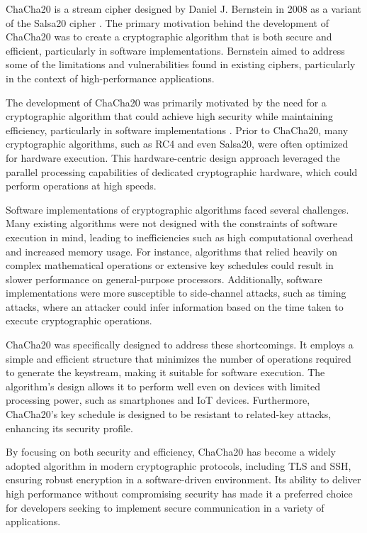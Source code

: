 \documentclass[a4paper,12pt]{report}
\begin{document}
ChaCha20 is a stream cipher designed by Daniel J. Bernstein in 2008 as a variant of the Salsa20 cipher \cite{bernstein2008chacha}.
The primary motivation behind the development of ChaCha20 was to create a cryptographic algorithm that is both secure and efficient, particularly in software implementations.
Bernstein aimed to address some of the limitations and vulnerabilities found in existing ciphers, particularly in the context of high-performance applications.

The development of ChaCha20 was primarily motivated by the need for a cryptographic algorithm that could achieve high security while maintaining efficiency, particularly in software implementations \cite{wikipedia_chacha20_poly1305}.
Prior to ChaCha20, many cryptographic algorithms, such as RC4 and even Salsa20, were often optimized for hardware execution.
This hardware-centric design approach leveraged the parallel processing capabilities of dedicated cryptographic hardware, which could perform operations at high speeds.

Software implementations of cryptographic algorithms faced several challenges.
Many existing algorithms were not designed with the constraints of software execution in mind, leading to inefficiencies such as high computational overhead and increased memory usage.
For instance, algorithms that relied heavily on complex mathematical operations or extensive key schedules could result in slower performance on general-purpose processors.
Additionally, software implementations were more susceptible to side-channel attacks, such as timing attacks, where an attacker could infer information based on the time taken to execute cryptographic operations.

ChaCha20 was specifically designed to address these shortcomings.
It employs a simple and efficient structure that minimizes the number of operations required to generate the keystream, making it suitable for software execution.
The algorithm's design allows it to perform well even on devices with limited processing power, such as smartphones and IoT devices.
Furthermore, ChaCha20's key schedule is designed to be resistant to related-key attacks, enhancing its security profile.

By focusing on both security and efficiency, ChaCha20 has become a widely adopted algorithm in modern cryptographic protocols, including TLS and SSH, ensuring robust encryption in a software-driven environment.
Its ability to deliver high performance without compromising security has made it a preferred choice for developers seeking to implement secure communication in a variety of applications.
\end{document}
